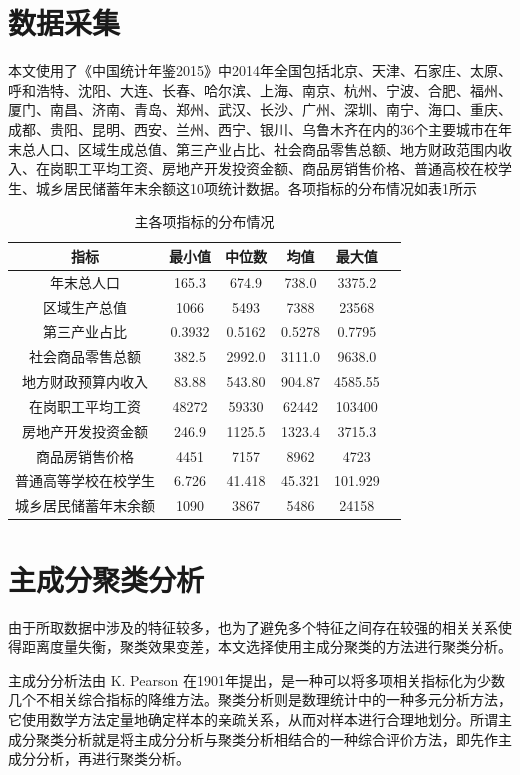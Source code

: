 \documentclass [a4paper]{article}
\begin{document}
\section{数据采集}
本文使用了《中国统计年鉴2015》中2014年全国包括北京、天津、石家庄、太原、呼和浩特、沈阳、大连、长春、哈尔滨、上海、南京、杭州、宁波、合肥、福州、厦门、南昌、济南、青岛、郑州、武汉、长沙、广州、深圳、南宁、海口、重庆、成都、贵阳、昆明、西安、兰州、西宁、银川、乌鲁木齐在内的36个主要城市在年末总人口、区域生成总值、第三产业占比、社会商品零售总额、地方财政范围内收入、在岗职工平均工资、房地产开发投资金额、商品房销售价格、普通高校在校学生、城乡居民储蓄年末余额这10项统计数据。各项指标的分布情况如表1所示
\begin{table}[h]
\centering
\caption{主各项指标的分布情况}
\small %
\begin{tabular}{cccccc}
\toprule
指标&最小值&中位数 &均值&最大值\\
\midrule

年末总人口 &	 165.3	&	 674.9&	 738.0&	3375.2 \\
区域生产总值&	1066	&	 5493	&	7388	&	23568 \\
第三产业占比	&	0.3932&	0.5162&	0.5278	&	0.7795 \\
社会商品零售总额&	 382.5	&	2992.0	&	3111.0	&	9638.0 \\
地方财政预算内收入	&	 83.88	&	 543.80	&	 904.87	&	4585.55 \\
在岗职工平均工资&	 48272	&	 59330	&	 62442	&	103400 \\
房地产开发投资金额	&	 246.9&	1125.5&	1323.4&	3715.3 \\
商品房销售价格	&	4451&	 7157	&	8962	&	4723 \\
普通高等学校在校学生	&	6.726	&	41.418&	45.321&	101.929\\
城乡居民储蓄年末余额	&	 1090	&	 3867	&	 5486	&	24158\\
\bottomrule
\end{tabular}
\end{table}
\section{主成分聚类分析}
由于所取数据中涉及的特征较多，也为了避免多个特征之间存在较强的相关关系使得距离度量失衡，聚类效果变差，本文选择使用主成分聚类的方法进行聚类分析。

主成分分析法由 K. Pearson 在1901年提出，是一种可以将多项相关指标化为少数几个不相关综合指标的降维方法。聚类分析则是数理统计中的一种多元分析方法， 它使用数学方法定量地确定样本的亲疏关系，从而对样本进行合理地划分。所谓主成分聚类分析就是将主成分分析与聚类分析相结合的一种综合评价方法，即先作主成分分析，再进行聚类分析。
\end{document}
